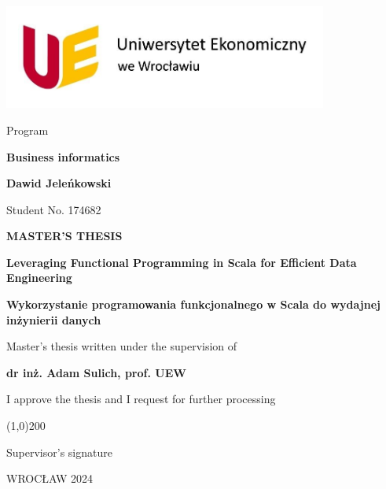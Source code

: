 \begin{titlepage}
\begin{center}

\vspace{0cm}
\includegraphics[width=0.8\textwidth]{images/uewroc.jpg}

\vspace{0cm}
Program

\textbf{Business informatics}

\vspace{0cm}
{\Large \textbf{Dawid Jeleńkowski}}

Student No. 174682

\vspace{1cm}
\textbf{MASTER’S THESIS}

\vspace{1cm}
{\huge \textbf{Leveraging Functional Programming in Scala for Efficient Data Engineering}}

\textbf{Wykorzystanie programowania funkcjonalnego w Scala do wydajnej inżynierii danych}

\vspace{2cm}
Master’s thesis written under the supervision of

{\Large \textbf{dr inż. Adam Sulich, prof. UEW}}

\vspace{1cm}
I approve the thesis and I request for further processing

\vspace{0cm}
\line(1,0){200}

Supervisor’s signature

\vspace{0cm}
WROCŁAW 2024
\end{center}
\end{titlepage}